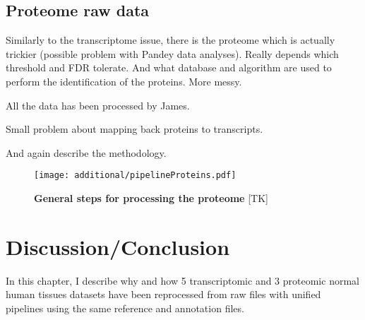 \subsection{Proteome raw data}

Similarly to the transcriptome issue, there is the proteome which is actually
trickier (possible problem with Pandey data analyses). Really depends which
threshold and \gls{FDR} tolerate. And what database and algorithm are used to perform
the identification of the proteins. More messy.

All the data has been processed by James.

Small problem about mapping back proteins to transcripts.



And again describe the methodology.

  \begin{figure}
      \texttt{[image: additional/pipelineProteins.pdf]}\centering
      \caption[General steps for processing the proteome
      data]{\label{fig:pipelineProt}\textbf{General steps for processing the
      proteome} [TK] }
  \end{figure}

\section{Discussion/Conclusion}

In this chapter, I describe why and how 5 transcriptomic and 3 proteomic normal
human tissues datasets have been reprocessed from raw files with unified
pipelines using the same reference and annotation files.




